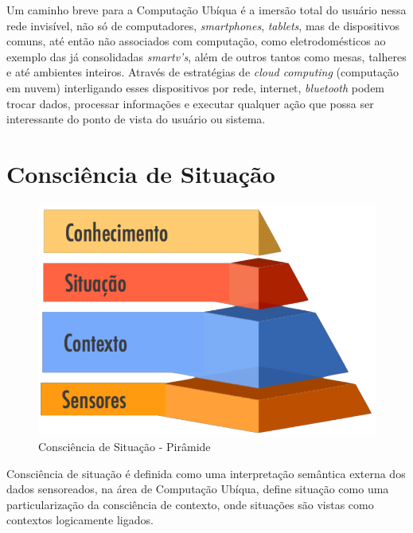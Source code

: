 \documentclass[12pt,a4paper,compsoc]{IEEEtran}
\begin{document}
  Um caminho breve para a Computação Ubíqua é a imersão total do usuário nessa rede invisível, não
  só de computadores, \textit{smartphones}, \textit{tablets}, mas de dispositivos comuns, até então
  não associados com computação, como eletrodomésticos ao exemplo das já consolidadas 
  \textit{smartv's}, além de outros tantos como mesas, talheres e até ambientes inteiros. Através
  de estratégias de \textit{cloud computing} (computação em nuvem) interligando esses dispositivos
  por rede, internet, \textit{bluetooth} podem trocar dados, processar informações e executar
  qualquer ação que possa ser interessante do ponto de vista do usuário ou sistema.
  

\section{Consciência de Situação}

  \begin{figure}[ht]
  \centerline{\includegraphics[scale=.20]{imagens/consciencia-de-situacao-piramide}}
  \caption{Consciência de Situação - Pirâmide \cite{almeida2013}}
  \label{cs-piramide}
  \end{figure}

  Consciência de situação é definida como uma interpretação semântica externa dos dados 
  sensoreados, na área de Computação Ubíqua, \cite{anagnostopoulos2006} define situação como uma 
  particularização da consciência de contexto, onde situações são vistas como contextos logicamente
  ligados.
  
\end{document}
